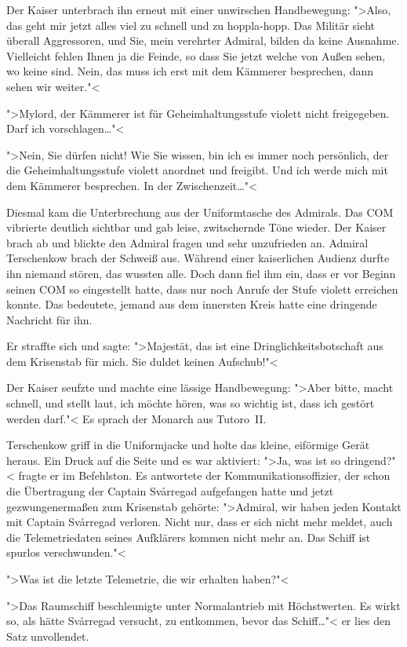\documentclass[11pt,twoside,openany]{scrbook}
\begin{document}
Der Kaiser unterbrach ihn erneut mit einer unwirschen Handbewegung: ">Also, das geht mir jetzt alles viel zu schnell und zu hoppla-hopp. Das Militär sieht überall Aggressoren, und Sie, mein verehrter Admiral, bilden da keine Ausnahme. Vielleicht fehlen Ihnen ja die Feinde, so dass Sie jetzt welche von Außen sehen, wo keine sind. Nein, das muss ich erst mit dem Kämmerer besprechen, dann sehen wir weiter."<

">Mylord, der Kämmerer ist für Geheimhaltungsstufe violett nicht freigegeben. Darf ich vorschlagen\dots"<

">Nein, Sie dürfen nicht! Wie Sie wissen, bin ich es immer noch persönlich, der die Geheimhaltungsstufe violett anordnet und freigibt. Und ich werde mich mit dem Kämmerer besprechen. In der Zwischenzeit\dots"<

Diesmal kam die Unterbrechung aus der Uniformtasche des Admirals. Das COM vibrierte deutlich sichtbar und gab leise, zwitschernde Töne wieder. Der Kaiser brach ab und blickte den Admiral fragen und sehr unzufrieden an. Admiral Terschenkow brach der Schweiß aus. Während einer kaiserlichen Audienz durfte ihn niemand stören, das wussten alle. Doch dann fiel ihm ein, dass er vor Beginn seinen COM so eingestellt hatte, dass nur noch Anrufe der Stufe violett erreichen konnte. Das bedeutete, jemand aus dem innersten Kreis hatte eine dringende Nachricht für ihn.

Er straffte sich und sagte: ">Majestät, das ist eine Dringlichkeitsbotschaft aus dem Krisenstab für mich. Sie duldet keinen Aufschub!"<

Der Kaiser seufzte und machte eine lässige Handbewegung: ">Aber bitte, macht schnell, und stellt laut, ich möchte hören, was so wichtig ist, dass ich gestört werden darf."< Es sprach der Monarch aus Tutoro~II.

Terschenkow griff in die Uniformjacke und holte das kleine, eiförmige Gerät heraus. Ein Druck auf die Seite und es war aktiviert: ">Ja, was ist so dringend?"< fragte er im Befehlston. Es antwortete der Kommunikationsoffizier, der schon die Übertragung der Captain Svårregad aufgefangen hatte und jetzt gezwungenermaßen zum Krisenstab gehörte: ">Admiral, wir haben jeden Kontakt mit Captain Svårregad verloren. Nicht nur, dass er sich nicht mehr meldet, auch die Telemetriedaten seines Aufklärers kommen nicht mehr an. Das Schiff ist spurlos verschwunden."<

">Was ist die letzte Telemetrie, die wir erhalten haben?"<

">Das Raumschiff beschleunigte unter Normalantrieb mit Höchstwerten. Es wirkt so, als hätte Svårregad versucht, zu entkommen, bevor das Schiff\dots"< er lies den Satz unvollendet.
\end{document}
